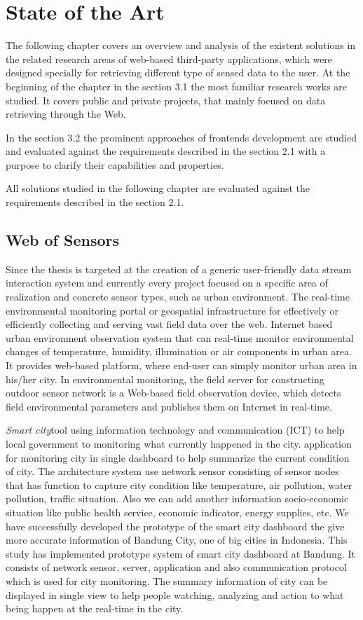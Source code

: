 \chapter{State of the Art}
The following chapter covers an overview and analysis of the existent solutions in the related research areas of web-based third-party applications, which were designed specially for retrieving different type of sensed data to the user. 
At the beginning of the chapter in the section 3.1 the most familiar research works are studied. It covers public and private projects, that mainly focused on data retrieving through the Web.

In the section 3.2 the prominent approaches of frontends development are studied and evaluated against the requirements described in the section 2.1 with a purpose to clarify their capabilities and properties.  

All solutions studied in the following chapter are evaluated against the requirements described in the section 2.1.

\section{Web of Sensors}
 Since the thesis is targeted at the creation of a generic user-friendly data stream interaction system and currently every project focused on a specific area of realization and concrete sensor types, such as urban environment\cite{song2010real}. The real-time environmental monitoring portal or geospatial infrastructure for effectively or  efficiently collecting and serving vast field data over the web. Internet based urban environment observation system that can real-time monitor environmental changes of temperature, humidity, illumination or air components in urban area. It provides web-based platform, where end-user can simply monitor urban area in his/her city. In environmental monitoring, the field server for constructing outdoor sensor network is a Web-based field observation device, which detects field environmental parameters and publishes them on Internet in real-time.

	\emph{Smart city}\cite{6588063}tool using information technology and communication (ICT) to help local government to monitoring what currently happened in the city. application for monitoring city in single dashboard to help summarize the current condition of city. The architecture system use network sensor consisting of sensor nodes that has function to capture city condition like temperature, air pollution, water pollution, traffic situation. Also we can add another information socio-economic situation like public health service, economic indicator, energy supplies, etc. We have successfully developed the prototype of the smart city dashboard the give more accurate information of Bandung City, one of big cities in Indonesia. This study has implemented prototype system of smart city dashboard at Bandung. It consists of network sensor, server, application and also communication protocol which is used for city monitoring. The summary information of city can be displayed in single view to help people watching, analyzing and action to what being happen at the real-time in the city.

